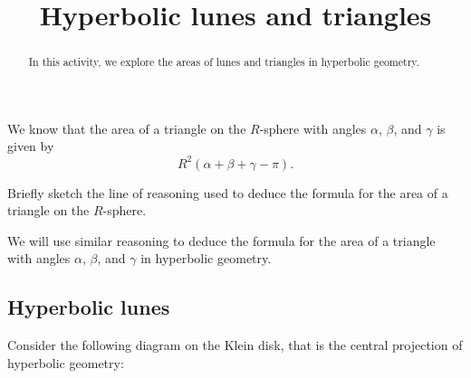\documentclass[newpage,hints,12pt,nooutcomes,noauthor,hints,handout]{ximera}
\title{Hyperbolic lunes and triangles}
\begin{document}
\begin{abstract}
In this activity, we explore the areas of lunes and triangles in
hyperbolic geometry.
\end{abstract}
\maketitle

We know that the area of a triangle on the $R$-sphere with angles
$\alpha$, $\beta$, and $\gamma$ is given by
\[
R^2(\alpha+\beta+\gamma - \pi).
\]

\begin{problem}
  Briefly sketch the line of reasoning used to deduce the formula for
  the area of a triangle on the $R$-sphere.
\end{problem}

We will use similar reasoning to deduce the formula for the area of a triangle
with angles $\alpha$, $\beta$, and $\gamma$ in hyperbolic geometry.

\subsection{Hyperbolic lunes}

Consider the following diagram on the Klein disk, that is the central projection
of hyperbolic geometry:
\begin{center}
\end{center}
\end{document}
